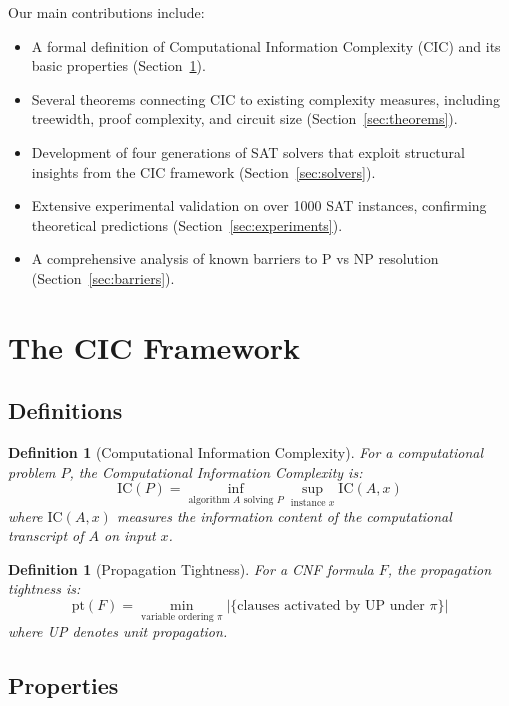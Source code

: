 \documentclass[11pt,a4paper]{article}
\newtheorem{definition}[theorem]{Definition}
\begin{document}
Our main contributions include:
\begin{itemize}
\item A formal definition of Computational Information Complexity (CIC) and its basic properties (Section~\ref{sec:framework}).
\item Several theorems connecting CIC to existing complexity measures, including treewidth, proof complexity, and circuit size (Section~\ref{sec:theorems}).
\item Development of four generations of SAT solvers that exploit structural insights from the CIC framework (Section~\ref{sec:solvers}).
\item Extensive experimental validation on over 1000 SAT instances, confirming theoretical predictions (Section~\ref{sec:experiments}).
\item A comprehensive analysis of known barriers to P vs NP resolution (Section~\ref{sec:barriers}).
\end{itemize}

\section{The CIC Framework}\label{sec:framework}

\subsection{Definitions}

\begin{definition}[Computational Information Complexity]\label{def:cic}
For a computational problem $P$, the Computational Information Complexity is:
\[
\text{IC}(P) = \inf_{\text{algorithm } A \text{ solving } P} \sup_{\text{instance } x} \text{IC}(A, x)
\]
where $\text{IC}(A, x)$ measures the information content of the computational transcript of $A$ on input $x$.
\end{definition}

\begin{definition}[Propagation Tightness]\label{def:pt}
For a CNF formula $F$, the propagation tightness is:
\[
\text{pt}(F) = \min_{\text{variable ordering } \pi} |\{\text{clauses activated by UP under } \pi\}|
\]
where UP denotes unit propagation.
\end{definition}

\subsection{Properties}
\end{document}
